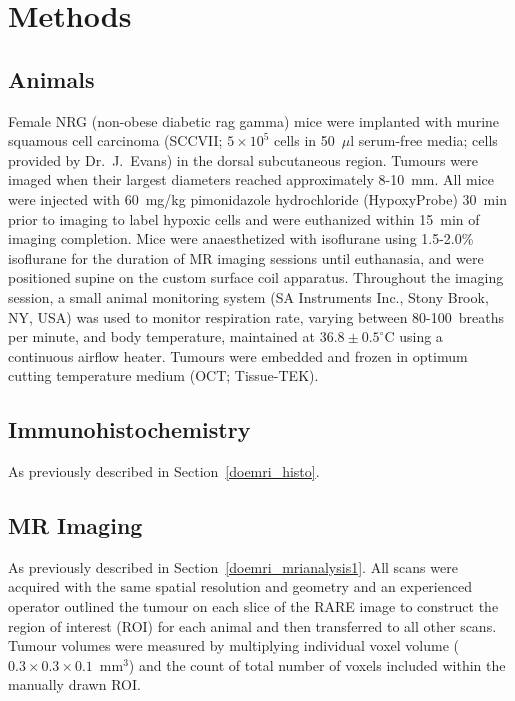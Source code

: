 \section{Methods}
\subsection{Animals}
Female NRG (non-obese diabetic rag gamma) mice were implanted with murine squamous cell carcinoma (SCCVII; $5\times 10^5$ cells in 50~$\mu$l serum-free media; cells provided by Dr.\ J.\ Evans) in the dorsal subcutaneous region.
Tumours were imaged when their largest diameters reached approximately 8-10~mm.
All mice were injected with 60~mg/kg pimonidazole hydrochloride (HypoxyProbe) 30~min prior to imaging to label hypoxic cells and were euthanized within 15~min of imaging completion.
Mice were anaesthetized with isoflurane using 1.5-2.0\% isoflurane for the duration of MR imaging sessions until euthanasia, and were positioned supine on the custom surface coil apparatus.
Throughout the imaging session, a small animal monitoring system (SA Instruments Inc., Stony Brook, NY, USA) was used to monitor respiration rate, varying between 80-100~breaths per minute, and body temperature, maintained at ${36.8\pm 0.5^\circ}$C using a continuous airflow heater. 
Tumours were embedded and frozen in optimum cutting temperature medium (OCT; Tissue-TEK).


\subsection{Immunohistochemistry}
As previously described in Section~\ref{doemri_histo}.

\subsection{MR Imaging}
As previously described in Section~\ref{doemri_mrianalysis1}.
All scans were acquired with the same spatial resolution and geometry and an experienced operator outlined the tumour on each slice of the RARE image to construct the region of interest (\acs{ROI}) for each animal and then transferred to all other scans.
Tumour volumes were measured by multiplying individual voxel volume ($0.3\times 0.3\times 0.1$~mm$^3$) and the count of total number of voxels included within the manually drawn \acs{ROI}.

